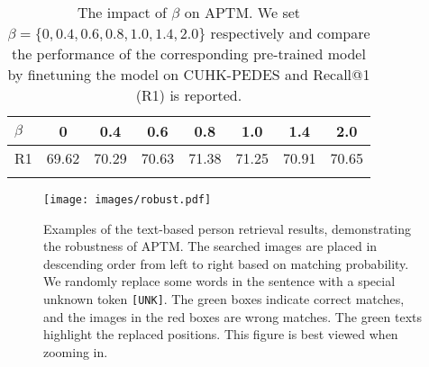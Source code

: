 \documentclass[sigconf]{acmart}
\begin{document}
\begin{table}[bp]
\small
\begin{center}
{
\setlength{\tabcolsep}{7pt}
\begin{tabular}{l|ccccccc}
\shline
$\beta$ & 0     & 0.4   & 0.6   & 0.8   & 1.0   & 1.4   & 2.0  \\
\hline
R1      & 69.62 & 70.29 & 70.63 & 71.38 & 71.25 & 70.91 & 70.65 \\
\shline
\end{tabular}}
\end{center}
\caption{ The impact of $\beta$ on APTM. We set $\beta = \{0, 0.4, 0.6, 0.8, 1.0, 1.4, 2.0\}$ respectively and compare the performance of the corresponding pre-trained model by finetuning the model on CUHK-PEDES and Recall@1 (R1) is reported.
}
\label{table:beta}
\end{table}


\begin{figure}[bp]
\begin{center}
   \texttt{[image: images/robust.pdf]}
\end{center}
\vspace{-.1in}
   \caption{Examples of the text-based person retrieval results, demonstrating the robustness of APTM. The searched images are placed in descending order from left to right based on matching probability. We randomly replace some words in the sentence with a special unknown token \texttt{[UNK]}. The green boxes indicate correct matches, and the images in the red boxes are wrong matches. The green texts highlight the replaced positions. This figure is best viewed when zooming in.}
\label{fig:roubustness}
\end{figure}
\end{document}

